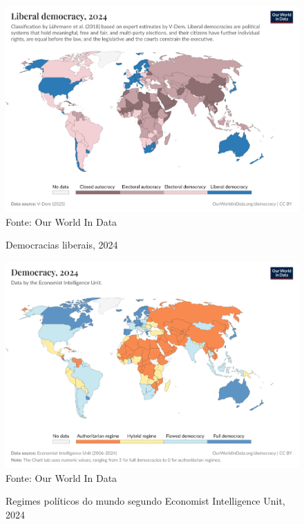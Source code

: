 \begin{figure}[ht]
    \centering
    \caption{Democracias liberais, 2024}
    \includegraphics[width=1\linewidth]{figuras/democracia/liberal-democracy-row.png}
    \label{fig:liberal-democracy-row}
    \footnotesize{Fonte: Our World In Data}
\end{figure}

\begin{figure}[ht]
    \centering
    \caption{Regimes políticos do mundo segundo Economist Intelligence Unit, 2024}
    \includegraphics[width=1\linewidth]{figuras/democracia/political-regime-eiu.png}
    \label{fig:political-regime-eiu}
    \footnotesize{Fonte: Our World In Data}
\end{figure}

